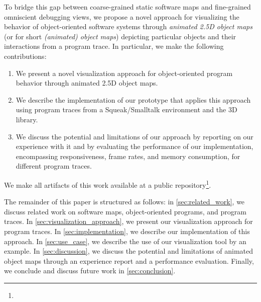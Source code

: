 To bridge this gap between coarse-grained static software maps and fine-grained omniscient debugging views, we propose a novel approach for visualizing the behavior of object-oriented software systems through \emph{animated 2.5D object maps} (or for short \emph{(animated) object maps}) depicting particular objects and their interactions from a program trace.
In particular, we make the following contributions:

\begin{enumerate}
	\item We present a novel visualization approach for ob\-ject-ori\-ent\-ed program behavior through animated 2.5D object maps.
	\item We describe the implementation of our prototype \tfd{} that applies this approach using program traces from a Squeak/\?Smalltalk environment and the  3D library.
	\item We discuss the potential and limitations of our approach by reporting on our experience with it and by evaluating the performance of our implementation, encompassing responsiveness, frame rates, and memory consumption, for different program traces.
\end{enumerate}

We make all artifacts of this work available at a public repository\footnote{}.

The remainder of this paper is structured as follows:
in \cref{sec:related_work}, we discuss related work on software maps, object-oriented programs, and program traces.
In \cref{sec:visualization_approach}, we present our visualization approach for program traces.
In \cref{sec:implementation}, we describe our implementation of this approach.
In \cref{sec:use_case}, we describe the use of our visualization tool by an example.
In \cref{sec:discussion}, we discuss the potential and limitations of animated object maps through an experience report and a performance evaluation.
Finally, we conclude and discuss future work in \cref{sec:conclusion}.
